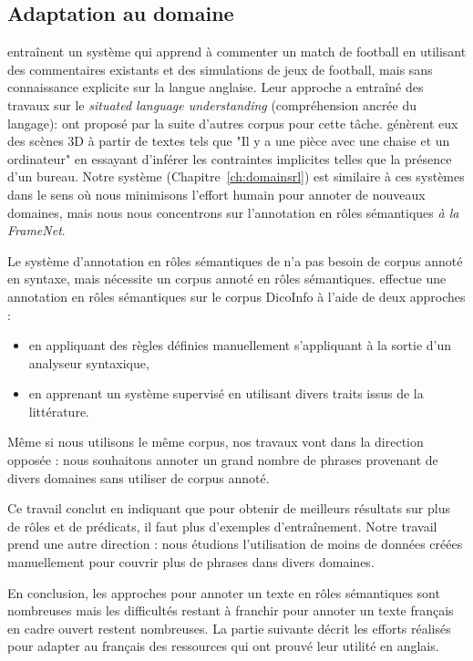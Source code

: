 \subsection{Adaptation au domaine}

\cite{chen2008learning} entraînent un système qui apprend à commenter un match
de football en utilisant des commentaires existants et des simulations de jeux
de football, mais sans connaissance explicite sur la langue anglaise.  Leur
approche a entraîné des travaux sur le \textit{situated language understanding}
(compréhension ancrée du langage):
\cite{bordes2010towards,richardson2012towards} ont proposé par la suite
d'autres corpus pour cette tâche. \cite{chang2014learning} génèrent eux des
scènes 3D à partir de textes tels que "Il y a une pièce avec une chaise et un
ordinateur" en essayant d'inférer les contraintes implicites telles que la
présence d'un bureau. Notre système (Chapitre~\ref{ch:domainsrl}) est similaire
à ces systèmes dans le sens où nous minimisons l'effort humain pour annoter de
nouveaux domaines, mais nous nous concentrons sur l'annotation en rôles
sémantiques \textit{à la FrameNet}.

Le système d'annotation en rôles sémantiques de \cite{gormley2014low} n'a pas
besoin de corpus annoté en syntaxe, mais nécessite un corpus annoté en rôles
sémantiques. \cite{hadouche2011annotation} effectue une annotation en rôles
sémantiques sur le corpus DicoInfo \citep{corpusolst} à l'aide de deux
approches :

\begin{itemize}
    \item en appliquant des règles définies manuellement s'appliquant à la
        sortie d'un analyseur syntaxique,
    \item en apprenant un système supervisé en utilisant divers traits issus de
        la littérature.
\end{itemize}

Même si nous utilisons le même corpus, nos travaux vont dans la direction
opposée : nous souhaitons annoter un grand nombre de phrases provenant de
divers domaines sans utiliser de corpus annoté.

Ce travail conclut en indiquant que pour obtenir de meilleurs résultats sur
plus de rôles et de prédicats, il faut plus d'exemples d'entraînement. Notre
travail prend une autre direction : nous étudions l'utilisation de moins de
données créées manuellement pour couvrir plus de phrases dans divers domaines.

En conclusion, les approches pour annoter un texte en rôles sémantiques sont
nombreuses mais les difficultés restant à franchir pour annoter un texte
français en cadre ouvert restent nombreuses. La partie suivante décrit les
efforts réalisés pour adapter au français des ressources qui ont prouvé leur
utilité en anglais.

